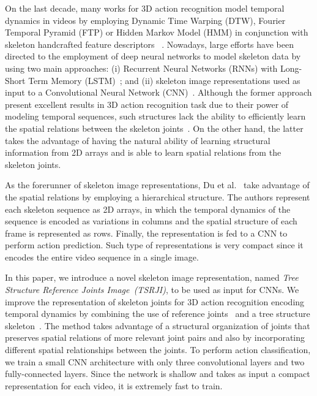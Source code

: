\documentclass[10pt,conference]{IEEEtran}
\def\metodo{Tree Structure Reference Joints Image}
\def\sigla{TSRJI}
\def\metodosigla{\metodo~(\sigla)}
\begin{document}
On the last decade, many works for 3D action recognition model temporal dynamics in videos by employing Dynamic Time Warping (DTW), Fourier Temporal Pyramid (FTP) or Hidden Markov Model (HMM) in conjunction with skeleton handcrafted feature descriptors ~\cite{Wang:2012, Yang:2012, Zanfir:2013, Gowayyed:2013, Wang:2014, Devanne:2015}. Nowadays, large efforts have been directed to the employment of deep neural networks to model skeleton data by using two main approaches: (i) Recurrent Neural Networks (RNNs) with Long-Short Term Memory (LSTM)~\cite{Veeriah:2015, Shahroudy:2016, Song:2017, Zhang:2017}; and (ii) skeleton image representations used as input to a Convolutional Neural Network (CNN)~\cite{Du:2015, Wang:2016, Liu:2017, Ke:2017, Li:2017, Wang:2018, Yang:2018, Li:2018, Choutas:2018}. Although the former approach present excellent results in 3D action recognition task due to their power of modeling temporal sequences, such structures lack the ability to efficiently learn the spatial relations between the skeleton joints~\cite{Yang:2018}. On the other hand, the latter takes the advantage of having the natural ability of learning structural information from 2D arrays and is able to learn spatial relations from the skeleton joints.

As the forerunner of skeleton image representations, Du et al.~\cite{Du:2015} take advantage of the spatial relations by employing a hierarchical structure. The authors represent each skeleton sequence as 2D arrays, in which the temporal dynamics of the sequence is encoded as variations in columns and the spatial structure of each frame is represented as rows. Finally, the representation is fed to a CNN to perform action prediction. Such type of representations is very compact since it encodes the entire video sequence in a single image.

In this paper, we introduce a novel skeleton image representation, named \emph{\metodosigla}, to be used as input for CNNs. We improve the representation of skeleton joints for 3D action recognition encoding temporal dynamics by combining the use of reference joints~\cite{Ke:2017} and a tree structure skeleton~\cite{Yang:2018}. The method takes advantage of a structural organization of joints that preserves spatial relations of more relevant joint pairs and also by incorporating different spatial relationships between the joints. To perform action classification, we train a small CNN architecture with only three convolutional layers and two fully-connected layers. Since the network is shallow and takes as input a compact representation for each video, it is extremely fast to train. 
\end{document}
